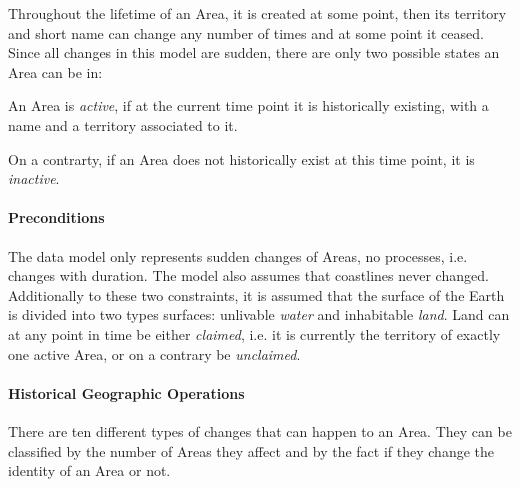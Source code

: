 Throughout the lifetime of an Area, it is created at some point, then its territory and short name can change any number of times and at some point it ceased. Since all changes in this model are sudden, there are only two possible states an Area can be in:
\begin{compactenum}
  \item An Area is \emph{active}, if at the current time point it is historically existing, with a name and a territory associated to it.
  \item On a contrarty, if an Area does not historically exist at this time point, it is \emph{inactive}.
\end{compactenum}


\paragraph{Preconditions} %
\label{par:preconditions}

The data model only represents sudden changes of Areas, no processes, i.e. changes with duration. The model also assumes that coastlines never changed. Additionally to these two constraints, it is assumed that the surface of the Earth is divided into two types surfaces: unlivable \emph{water} and inhabitable \emph{land}. Land can at any point in time be either \emph{claimed}, i.e. it is currently the territory of exactly one active Area, or on a contrary be \emph{unclaimed}.


\paragraph{Historical Geographic Operations} %
\label{par:historical_geographic_operations}

There are ten different types of changes that can happen to an Area. They can be classified by the number of Areas they affect and by the fact if they change the identity of an Area or not.

